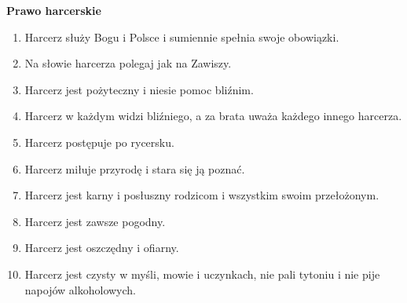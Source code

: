 \textbf{Prawo harcerskie}%
\begin{enumerate} 
\item Harcerz służy Bogu i Polsce i sumiennie spełnia swoje obowiązki.
\item Na słowie harcerza polegaj jak na Zawiszy.
\item Harcerz jest pożyteczny i niesie pomoc bliźnim.
\item Harcerz w każdym widzi bliźniego, a za brata uważa każdego innego harcerza.
\item Harcerz postępuje po rycersku.
\item Harcerz miłuje przyrodę i stara się ją poznać.
\item Harcerz jest karny i posłuszny rodzicom i wszystkim swoim przełożonym.
\item Harcerz jest zawsze pogodny.
\item Harcerz jest oszczędny i ofiarny.
\item Harcerz jest czysty w myśli, mowie i uczynkach, nie pali tytoniu i nie pije napojów alkoholowych.
\end{enumerate}


